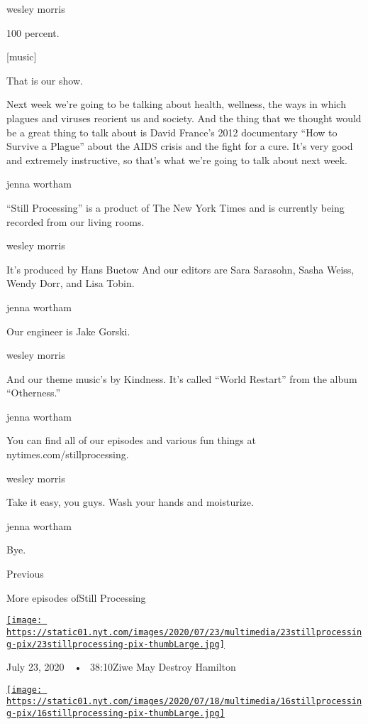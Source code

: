 wesley morris

100 percent.

{[}music{]}

That is our show.

Next week we're going to be talking about health, wellness, the ways in
which plagues and viruses reorient us and society. And the thing that we
thought would be a great thing to talk about is David France's 2012
documentary ``How to Survive a Plague'' about the AIDS crisis and the
fight for a cure. It's very good and extremely instructive, so that's
what we're going to talk about next week.

jenna wortham

``Still Processing'' is a product of The New York Times and is currently
being recorded from our living rooms.

wesley morris

It's produced by Hans Buetow And our editors are Sara Sarasohn, Sasha
Weiss, Wendy Dorr, and Lisa Tobin.

jenna wortham

Our engineer is Jake Gorski.

wesley morris

And our theme music's by Kindness. It's called ``World Restart'' from
the album ``Otherness.''

jenna wortham

You can find all of our episodes and various fun things at
nytimes.com/stillprocessing.

wesley morris

Take it easy, you guys. Wash your hands and moisturize.

jenna wortham

Bye.

Previous

More episodes ofStill Processing

\href{https://www.nytimes.com/2020/07/23/podcasts/hamilton-ziwe-discomfort.html?action=click\&module=audio-series-bar\&region=header\&pgtype=Article}{\texttt{[image: https://static01.nyt.com/images/2020/07/23/multimedia/23stillprocessing-pix/23stillprocessing-pix-thumbLarge.jpg]}}

July 23, 2020~~•~ 38:10Ziwe May Destroy Hamilton

\href{https://www.nytimes.com/2020/07/16/podcasts/reparations-for-aunt-jemima.html?action=click\&module=audio-series-bar\&region=header\&pgtype=Article}{\texttt{[image: https://static01.nyt.com/images/2020/07/18/multimedia/16stillprocessing-pix/16stillprocessing-pix-thumbLarge.jpg]}}

